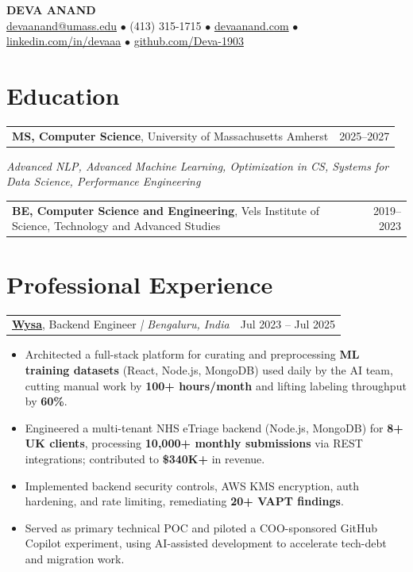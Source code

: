 \documentclass[letterpaper,11pt]{article}
\makeatletter
\newcommand{\eduItem}[3]{%
  \begin{tabular*}{\textwidth}{@{}l@{\extracolsep{\fill}}r@{}}
    \textbf{#1}, #2 & #3 \\
  \end{tabular*}\par
}
\newcommand{\expItem}[4]{%
  \vspace{3pt}
  \begin{tabular*}{\textwidth}{@{}l@{\extracolsep{\fill}}r@{}}
    \textbf{#1}, #2 \textit{| #3} & #4 \\
  \end{tabular*}\par\vspace{-2pt}
}
\makeatother
\begin{document}
\begin{center}
    {\fontsize{18}{20}\selectfont\bfseries DEVA ANAND}\\ \vspace{3pt}
    {\small
    \href{mailto:devaanand@umass.edu}{devaanand@umass.edu}
    \enspace$\bullet$\enspace
    (413) 315-1715
    \enspace$\bullet$\enspace
    \href{https://devaanand.com}{devaanand.com}
    \enspace$\bullet$\enspace
    \href{https://linkedin.com/in/devaaa/}{linkedin.com/in/devaaa}
    \enspace$\bullet$\enspace
    \href{https://github.com/Deva-1903}{github.com/Deva-1903}}
\end{center}
\vspace{-6pt}

\section{Education}
\eduItem{MS, Computer Science}{University of Massachusetts Amherst}{2025--2027}
{\small\textit{Advanced NLP, Advanced Machine Learning, Optimization in CS, Systems for Data Science, Performance Engineering}}\par
\vspace{3pt}
\eduItem{BE, Computer Science and Engineering}{Vels Institute of Science, Technology and Advanced Studies}{2019--2023}

\section{Professional Experience}

\expItem{\href{https://www.wysa.io}{Wysa}}{Backend Engineer}{Bengaluru, India}{Jul 2023 -- Jul 2025}
\begin{itemize}
  \item Architected a full-stack platform for curating and preprocessing \textbf{ML training datasets} (React, Node.js, MongoDB) used daily by the AI team, cutting manual work by \textbf{100+ hours/month} and lifting labeling throughput by \textbf{60\%}.
  \item Engineered a multi-tenant NHS eTriage backend (Node.js, MongoDB) for \textbf{8+ UK clients}, processing \textbf{10{,}000+ monthly submissions} via REST integrations; contributed to \textbf{\$340K+} in revenue.
  \item Implemented backend security controls, AWS KMS encryption, auth hardening, and rate limiting, remediating \textbf{20+ VAPT findings}.
  \item Served as primary technical POC and piloted a COO-sponsored GitHub Copilot experiment, using AI-assisted development to accelerate tech-debt and migration work.
\end{itemize}
\end{document}
